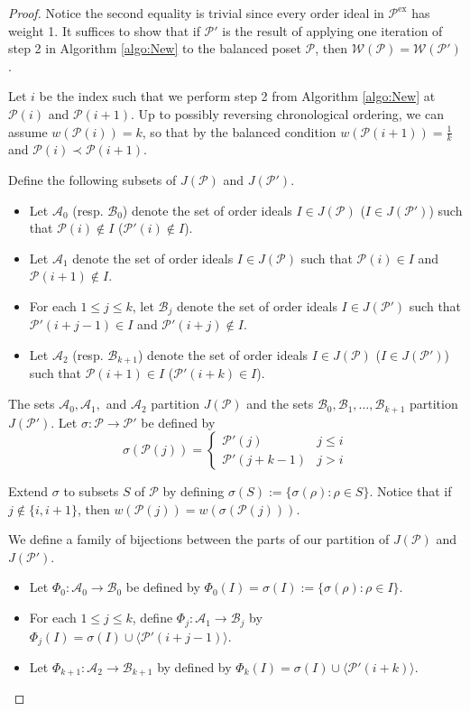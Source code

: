 \documentclass[12pt, letterpaper,table]{amsart}
\theoremstyle{remark}
\newcommand{\calP}{\mathcal{P}}
\newcommand{\calA}{\mathcal{A}}
\newcommand{\calB}{\mathcal{B}}
\newcommand{\exx}{\mathrm{ex}}
\newcommand{\wt}{w}
\begin{document}
\begin{proof}
Notice the second equality is trivial since every order ideal in $\calP^\exx$ has weight 1. It suffices to show that if $\calP'$ is the result of applying one iteration of step 2 in Algorithm \ref{algo:New} to the balanced poset $\calP$, then $\mathcal{W}(\calP) = \mathcal{W}(\calP')$.

Let $i$ be the index such that we perform step 2 from Algorithm \ref{algo:New} at $\calP(i)$ and $\calP(i+1)$. Up to possibly reversing chronological ordering, we can assume $\wt(\calP(i)) = k$, so that by the balanced condition $\wt(\calP(i+1)) = \frac1k$ and $\calP(i) \prec \calP(i+1)$.

Define the following subsets of $J(\calP)$ and $J(\calP')$.

\begin{itemize}
    \item Let $\calA_0$ (resp. $\calB_0$) denote the set of order ideals $I \in J(\calP)$ ($I \in J(\calP')$) such that $\calP(i) \notin I$ ($\calP'(i) \notin I$). 
    \item Let $\calA_1$ denote the set of order ideals $I \in J(\calP)$ such that $\calP(i) \in I$ and $\calP(i+1) \notin I$.
    \item For each $1 \leq j \leq k$, let $\calB_j$ denote the set of order ideals $I \in J(\calP')$ such that $\calP'(i+j-1) \in I$ and $\calP'(i+j) \notin I$.
    \item Let $\calA_2$ (resp. $\calB_{k+1}$) denote the set of order ideals $I \in J(\calP)$ ($I \in J(\calP')$) such that $\calP(i+1) \in I$ ($\calP'(i+k) \in I$).
\end{itemize}

The sets $\calA_0,\calA_1,$ and $\calA_2$ partition $J(\calP)$ and the sets $\calB_0,\calB_1,\ldots,\calB_{k+1}$ partition $J(\calP')$. Let $\sigma: \calP \to \calP'$ be defined by \[
\sigma(\calP(j)) = \begin{cases} \calP'(j) & j \leq i \\ 
\calP'(j + k - 1) & j > i \end{cases}
\]

Extend $\sigma$ to subsets $S$ of $\calP$ by defining $\sigma(S):=\{\sigma(\rho): \rho \in S\}$.
Notice that if $j \notin \{i,i+1\}$, then $\wt(\calP(j)) = \wt(\sigma(\calP(j)))$.

We define a family of bijections between the parts of our partition of $J(\calP)$ and $J(\calP')$.
\begin{itemize}
    \item Let $\Phi_0: \calA_0 \to \calB_0$ be defined by $\Phi_0(I)=\sigma(I) := \{\sigma(\rho) : \rho \in I\}$. 
    \item For each $1 \leq j \leq k$, define $\Phi_j: \calA_1 \to \calB_j$ by $\Phi_j(I) = \sigma(I) \cup \langle \calP'(i+j-1)\rangle$. 
    \item Let $\Phi_{k+1}: \calA_2 \to \calB_{k+1}$ by defined by $\Phi_k(I) = \sigma(I) \cup \langle \calP'(i+k)\rangle$.
\end{itemize}


\end{proof}
\end{document}
